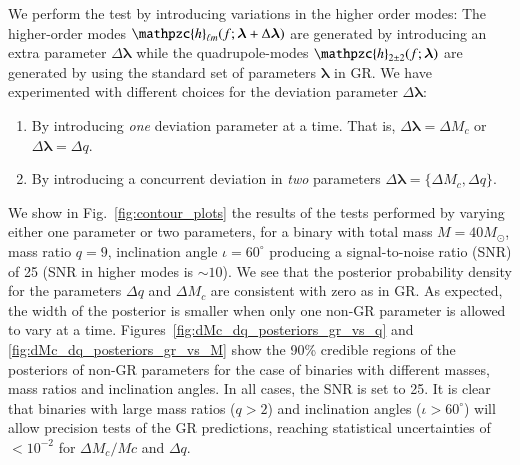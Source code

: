 \documentclass[prl,preprintnumbers,twocolumn,eqsecnum,floatfix,a4paper,nofootinbib,superscriptaddress]{revtex4}
\newcommand{\h}{\mathpzc{h}}
\newcommand{\hlm}{\mathpzc{h}_{\ell m}}
\newcommand{\blambda}{\bm{\lambda}}
\begin{document}
We perform the test by introducing variations in the higher order modes: The higher-order modes $\hlm(f; \blambda+\Delta\blambda)$ are generated by introducing an extra parameter $\Delta\blambda$ while the quadrupole-modes $\h_{2\pm2}(f; \blambda)$ are generated by using the standard set of parameters $\blambda$ in GR. We have experimented with different choices for the deviation parameter $\Delta\blambda$: 
\begin{enumerate}
\item By introducing \emph{one} deviation parameter at a time. That is, $\Delta\blambda = {\Delta M_c}$ or $\Delta\blambda = {\Delta q}$. 
\item By introducing a concurrent deviation in \emph{two} parameters $\Delta \blambda = \{\Delta M_c, \Delta q\}$. 
\end{enumerate}
We show in Fig.~\ref{fig:contour_plots} the results of the tests performed by varying either one parameter or two parameters, for a binary with total mass $M = 40M_{\odot}$, mass ratio $q=9$, inclination angle $ {\iota}=60^{\circ} $ producing a signal-to-noise ratio  (SNR)  of 25 (SNR in higher modes is $\sim 10$). We see that the posterior probability density for the parameters $\Delta q$ and $\Delta M_c$ are consistent with zero as in GR. As expected, the width of the posterior is smaller when only one non-GR parameter is allowed to vary at a time. Figures~\ref{fig:dMc_dq_posteriors_gr_vs_q} and \ref{fig:dMc_dq_posteriors_gr_vs_M} show the 90\% credible regions of the posteriors of non-GR parameters for the case of binaries with different masses, mass ratios and inclination angles. In all cases, the SNR is set to {25}.  It is clear that binaries with large mass ratios ($q > 2$) and inclination angles ($\iota > 60 ^\circ $) will allow precision tests of the GR predictions, reaching statistical uncertainties of $< 10^{-2}$ for $\Delta M_c/Mc$ and $\Delta q$.   
\end{document}
